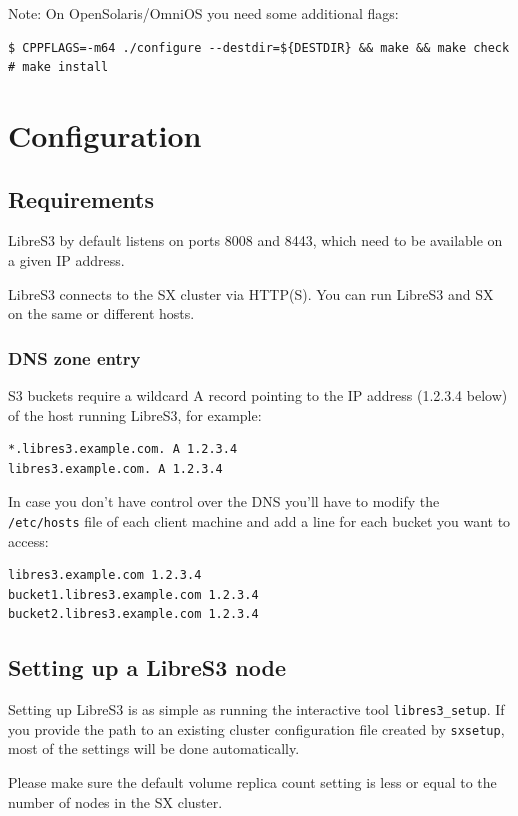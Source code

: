 Note: On OpenSolaris/OmniOS you need some additional flags:
\begin{lstlisting}
$ CPPFLAGS=-m64 ./configure --destdir=${DESTDIR} && make && make check
# make install
\end{lstlisting}
\chapter{Configuration}

\section*{Requirements}

LibreS3 by default listens on ports 8008 and 8443, which need to be available on a given
IP address.

LibreS3 connects to the SX cluster via HTTP(S). You can run LibreS3 and SX
on the same or different hosts.

\subsection*{DNS zone entry}

S3 buckets require a wildcard A record pointing to the IP address (1.2.3.4 below) of the
host running LibreS3, for example:

\begin{lstlisting}
*.libres3.example.com. A 1.2.3.4
libres3.example.com. A 1.2.3.4
\end{lstlisting}


In case you don't have control over the DNS you'll have to modify the \verb|/etc/hosts| file
of each client machine and add a line for each bucket you want to access:

\begin{lstlisting}
libres3.example.com 1.2.3.4
bucket1.libres3.example.com 1.2.3.4
bucket2.libres3.example.com 1.2.3.4
\end{lstlisting}


\section*{Setting up a LibreS3 node}

Setting up LibreS3 is as simple as running the interactive tool \verb+libres3_setup+.
If you provide the path to an existing \SX cluster configuration file created
by \verb+sxsetup+, most of the settings will be done automatically.

Please make sure the default volume replica count setting is less or equal
to the number of nodes in the SX cluster.

